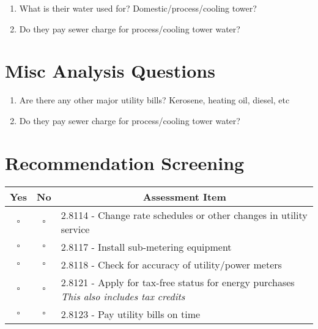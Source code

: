 \documentclass[./main.tex]{subfiles}
\begin{document}
\begin{enumerate}[leftmargin=*]
\item What is their water used for? Domestic/process/cooling tower?

\vspace{\answerspace}

\item Do they pay sewer charge for process/cooling tower water? 

\vspace{\answerspace}

\end{enumerate}

\section*{Misc Analysis Questions}

\begin{enumerate}[leftmargin=*]
\item Are there any other major utility bills? Kerosene, heating oil, diesel, etc

\vspace{\answerspace}

\item Do they pay sewer charge for process/cooling tower water? 

\vspace{\answerspace}

\end{enumerate}


\section*{Recommendation Screening}
\begin{tabular}{|c|c|p{13.5cm}|}
\hline
\multicolumn{1}{|c|}{\textbf{Yes}} & \multicolumn{1}{c|}{\textbf{No}} & \multicolumn{1}{c|}{\textbf{Assessment Item}} \\
\hline
$\square$ & $\square$ & 2.8114 - Change rate schedules or other changes in utility service \\ \hline
$\square$ & $\square$ & 2.8117 - Install sub-metering equipment \\ \hline
$\square$ & $\square$ & 2.8118 - Check for accuracy of utility/power meters \\ \hline
$\square$ & $\square$ & 2.8121 - Apply for tax-free status for energy purchases \emph{This also includes tax credits} \\ \hline
$\square$ & $\square$ & 2.8123 - Pay utility bills on time \\ \hline
\end{tabular}




\end{document}
